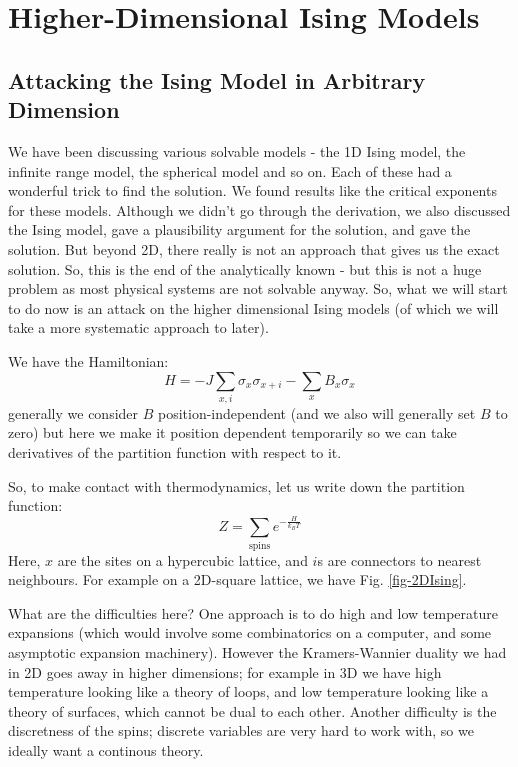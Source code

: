 \section{Higher-Dimensional Ising Models}


\subsection{Attacking the Ising Model in Arbitrary Dimension}
We have been discussing various solvable models - the 1D Ising model, the infinite range model, the spherical model and so on. Each of these had a wonderful trick to find the solution. We found results like the critical exponents for these models. Although we didn't go through the derivation, we also discussed the Ising model, gave a plausibility argument for the solution, and gave the solution. But beyond 2D, there really is not an approach that gives us the exact solution. So, this is the end of the analytically known - but this is not a huge problem as most physical systems are not solvable anyway. So, what we will start to do now is an attack on the higher dimensional Ising models (of which we will take a more systematic approach to later).

We have the Hamiltonian:
\begin{equation}
    H = -J\sum_{x, i}\sigma_x\sigma_{x+i} - \sum_x B_x\sigma_x
\end{equation}
generally we consider $B$ position-independent (and we also will generally set $B$ to zero) but here we make it position dependent temporarily so we can take derivatives of the partition function with respect to it.

So, to make contact with thermodynamics, let us write down the partition function:
\begin{equation}
    Z = \sum_{\text{spins}} e^{-\frac{H}{k_B T}}
\end{equation}
Here, $x$ are the sites on a hypercubic lattice, and $i$s are connectors to nearest neighbours. For example on a 2D-square lattice, we have Fig. \ref{fig-2DIsing}.

What are the difficulties here? One approach is to do high and low temperature expansions (which would involve some combinatorics on a computer, and some asymptotic expansion machinery). However the Kramers-Wannier duality we had in 2D goes away in higher dimensions; for example in 3D we have high temperature looking like a theory of loops, and low temperature looking like a theory of surfaces, which cannot be dual to each other. Another difficulty is the discretness of the spins; discrete variables are very hard to work with, so we ideally want a continous theory.

